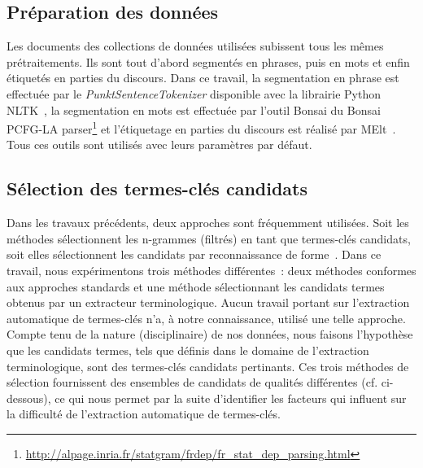   \subsection{Préparation des données}
  \label{subsec:preparation_des_donnees}
    Les documents des collections de données utilisées subissent tous les mêmes
    prétraitements. Ils sont tout d'abord segmentés en phrases, puis en mots et
    enfin étiquetés en parties du discours. Dans ce travail, la segmentation en
    phrase est effectuée par le \textit{PunktSentenceTokenizer} disponible avec
    la librairie Python NLTK~\cite[\textit{Natural Language
    ToolKit}]{bird2009nltk}, la segmentation en mots est effectuée par l'outil
    Bonsai du Bonsai PCFG-LA
    parser\footnote{\url{http://alpage.inria.fr/statgram/frdep/fr_stat_dep_parsing.html}}
    et l'étiquetage en parties du discours est réalisé par
    MElt~\cite{denis2009melt}. Tous ces outils sont utilisés avec leurs
    paramètres par défaut.

  \subsection{Sélection des termes-clés candidats}
  \label{subsec:extraction_de_termes_cles_candidats}
    Dans les travaux précédents, deux approches sont fréquemment utilisées. Soit
    les méthodes sélectionnent les n-grammes (filtrés) en tant que termes-clés
    candidats, soit elles sélectionnent les candidats par reconnaissance de
    forme~\cite{hulth2003keywordextraction}. Dans ce travail, nous expérimentons
    trois méthodes différentes~: deux méthodes conformes aux approches standards
    et une méthode sélectionnant les candidats termes obtenus par un extracteur
    terminologique. Aucun travail portant sur l'extraction automatique de
    termes-clés n'a, à notre connaissance, utilisé une telle approche. Compte
    tenu de la nature (disciplinaire) de nos données, nous faisons l'hypothèse
    que les candidats termes, tels que définis dans le domaine de l'extraction
    terminologique, sont des termes-clés candidats pertinants. Ces trois
    méthodes de sélection fournissent des ensembles de candidats de qualités
    différentes (cf. ci-dessous), ce qui nous permet par la suite d'identifier
    les facteurs qui influent sur la difficulté de l'extraction automatique de
    termes-clés.

